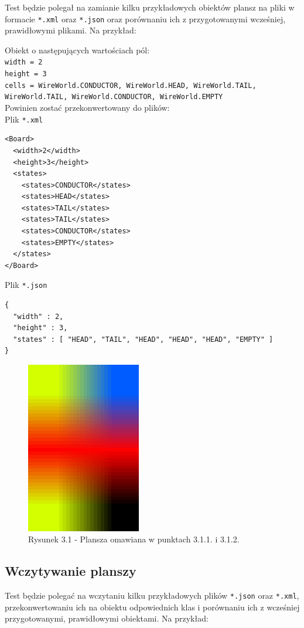 \documentclass{report}
\begin{document}
Test będzie polegał na zamianie kilku przykładowych obiektów plansz na pliki w formacie \texttt{*.xml} oraz \texttt{*.json} oraz porównaniu ich z przygotowanymi wcześniej, prawidłowymi plikami. Na przykład:

Obiekt o następujących wartościach pól:\\

\noindent \texttt{width = 2}\\
\texttt{height = 3}\\
\texttt{cells = {WireWorld.CONDUCTOR, WireWorld.HEAD, WireWorld.TAIL, WireWorld.TAIL, WireWorld.CONDUCTOR, WireWorld.EMPTY}}\\


Powinien zostać przekonwertowany do plików:\\

\noindent Plik \texttt{*.xml}
\begin{verbatim}
<Board>
  <width>2</width>
  <height>3</height>
  <states>
    <states>CONDUCTOR</states>
    <states>HEAD</states>
    <states>TAIL</states>
    <states>TAIL</states>
    <states>CONDUCTOR</states>
    <states>EMPTY</states>
  </states>
</Board>
\end{verbatim}
\noindent Plik \texttt{*.json}
\begin{verbatim}
{
  "width" : 2,
  "height" : 3,
  "states" : [ "HEAD", "TAIL", "HEAD", "HEAD", "HEAD", "EMPTY" ]
}
\end{verbatim}

 \begin{figure}
	\hspace*{3.5cm}\includegraphics[width=5cm]{przyklad-planszy-wireworld}
	\caption{Rysunek 3.1 - Plansza omawiana w punktach 3.1.1. i 3.1.2.}
\end{figure}

\subsection{Wczytywanie planszy}
Test będzie polegać na wczytaniu kilku przykładowych plików \texttt{*.json} oraz \texttt{*.xml}, przekonwertowaniu ich na obiektu odpowiednich klas i porównaniu ich z wcześniej przygotowanymi, prawidłowymi obiektami. Na przykład: \\
\end{document}
